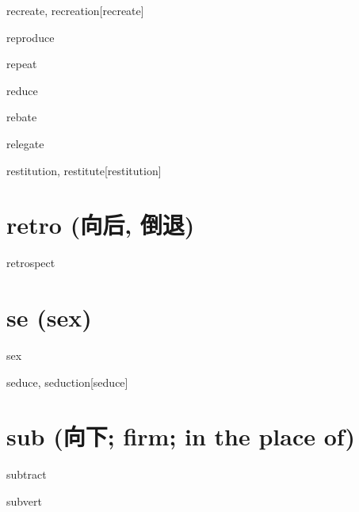 \begin{RefWord}{recreate, recreation}[recreate]
\end{RefWord}

\begin{RefWord}{reproduce}
\end{RefWord}

\begin{RefWord}{repeat}
\end{RefWord}

\begin{RefWord}{reduce}
\end{RefWord}

\begin{RefWord}{rebate}
\end{RefWord}

\begin{RefWord}{relegate}
\end{RefWord}

\begin{RefWord}{restitution, restitute}[restitution]
\end{RefWord}

\section{retro (向后, 倒退)}
\begin{RefWord}{retrospect}
\end{RefWord}

\section{se (sex)}

\begin{RefWord}{sex}
\end{RefWord}

\begin{RefWord}{seduce, seduction}[seduce]
\end{RefWord}


\section{sub (向下; firm; in the place of)}

\begin{RefWord}{subtract}
\end{RefWord}

\begin{RefWord}{subvert}
\end{RefWord}

